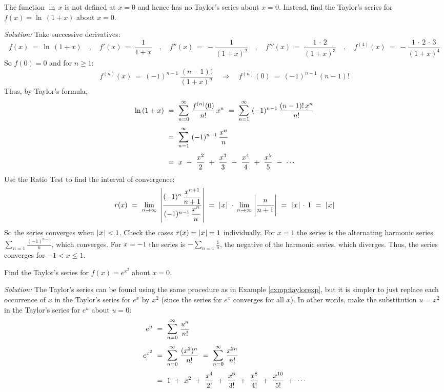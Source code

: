 \begin{exmp}\label{exmp:taylorlog}
\noindent The function $\ln\,x$ is not defined at $x=0$ and hence has no
Taylor's series about $x=0$. Instead, find the Taylor's series for
$f(x)=\ln\,(1+x)$ about $x=0$.\vspace{1mm}
\par\noindent\emph{Solution:} Take successive derivatives:
\[
f(x) ~=~ \ln\,(1+x) \quad,\quad
f'(x) ~=~ \frac{1}{1+x} \quad,\quad
f''(x) ~=~ -\frac{1}{(1+x)^2} \quad,\quad
f'''(x) ~=~ \frac{1 \,\cdot\, 2}{(1+x)^3} \quad,\quad
f^{(4)}(x) ~=~ -\frac{1 \,\cdot\, 2 \,\cdot\, 3}{(1+x)^4}
\]
So $f(0)=0$ and for $n\ge 1$:
\[
f^{(n)}(x) ~=~ (-1)^{n-1}\,\frac{(n-1) !}{(1+x)^n} \quad\Rightarrow\quad
f^{(n)}(0) ~=~ (-1)^{n-1}\,(n-1) !
\]
Thus, by Taylor's formula,
\begin{align*}
\ln\,(1+x) ~&=~ \bigsum{n=0}{\infty}~ \frac{f^{(n)}(0)}{n !}\,x^n ~=~
\bigsum{n=1}{\infty}~ (-1)^{n-1}\,\frac{(n-1) !\,x^{n}}{n !}\\[4pt]
&=~ \bigsum{n=1}{\infty}~ (-1)^{n-1}\,\frac{x^{n}}{n}\\[4pt]
&=~ x ~-~ \frac{x^2}{2} ~+~ \frac{x^3}{3} ~-~ \frac{x^4}{4} ~+~
\frac{x^5}{5} ~-~ \cdots
\end{align*}
Use the Ratio Test to find the interval of convergence:
\[
r(x) ~=~ \lim_{n \to \infty} \;\left|\dfrac{(-1)^{n}\,\dfrac{x^{n+1}}{n+1}}
{(-1)^{n-1}\,\dfrac{x^{n}}{n}}\right| ~=~
\lvert\mspace{1mu}x\mspace{1mu}\rvert \;\cdot\; \lim_{n \to \infty} \;\Biggl|\frac{n}{n+1}\Biggr| ~=~
\lvert\mspace{1mu}x\mspace{1mu}\rvert \,\cdot\, 1 ~=~ \lvert\mspace{1mu}x\mspace{1mu}\rvert
\]
So the series converges when $\lvert\mspace{1mu}x\mspace{1mu}\rvert < 1$. Check the cases $r(x)=\lvert\mspace{1mu}x\mspace{1mu}\rvert=1$
individually. For $x=1$ the series is the alternating harmonic series
$\sum_{n=1} \frac{(-1)^{n-1}}{n}$, which converges. For $x=-1$ the series is
$-\sum_{n=1} \frac{1}{n}$, the negative of the harmonic series, which diverges.
Thus, the series converges for $-1<x\le 1$.
\end{exmp}
\begin{exmp}\label{exmp:taylorexp2}
\noindent Find the Taylor's series for $f(x)=e^{x^2}$ about $x=0$.\vspace{1mm}
\par\noindent\emph{Solution:} The Taylor's series can be found using the same
procedure as in Example \ref{exmp:taylorexp}, but it is simpler to just
replace each occurrence of $x$ in the Taylor's series for $e^x$ by $x^2$ (since
the series for $e^x$ converges for all $x$). In
other words, make the substitution $u=x^2$ in the Taylor's series for $e^u$
about $u=0$:
\begin{align*}
e^u ~&=~ \bigsum{n=0}{\infty}~ \frac{u^n}{n !}\\[4pt]
e^{x^2} ~&=~ \bigsum{n=0}{\infty}~ \frac{(x^2)^n}{n !} ~=~
\bigsum{n=0}{\infty}~ \frac{x^{2n}}{n !}\\[4pt]
&=~ 1 ~+~ x^2 ~+~ \frac{x^4}{2 !} ~+~ \frac{x^6}{3 !} ~+~
\frac{x^8}{4 !} ~+~ \frac{x^{10}}{5 !} ~+~ \cdots
\end{align*}
\end{exmp}
